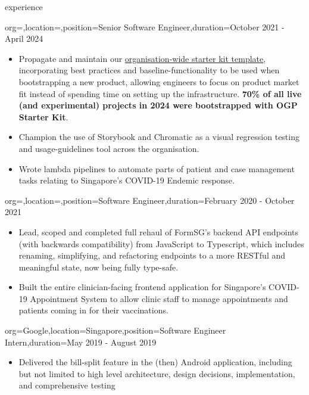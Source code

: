 \documentclass{resume}
\begin{document}
\begin{ResumeSection}{experience}
\begin{ResumeSubsection}{org=,location=,position={Senior Software Engineer},duration=October 2021 - April 2024}
\begin{itemize}
            \item Propagate and maintain our \href{https://start.open.gov.sg/}{organisation-wide starter kit template}, incorporating best practices and baseline-functionality to be used when bootstrapping a new product, allowing engineers to focus on product market fit instead of spending time on setting up the infrastructure. \textbf{70\% of all live (and experimental) projects in 2024 were bootstrapped with OGP Starter Kit}.
            \item Champion the use of Storybook and Chromatic as a visual regression testing and usage-guidelines tool across the organisation.
            \item Wrote lambda pipelines to automate parts of patient and case management tasks relating to Singapore’s COVID-19 Endemic response.
        \end{itemize}
        \medskip
    \end{ResumeSubsection}
    \begin{ResumeSubsection}{org=,location=,position={Software Engineer},duration=February 2020 - October 2021}
        \begin{itemize}
            \item Lead, scoped and completed full rehaul of FormSG’s backend API endpoints (with backwards compatibility) from JavaScript to Typescript, which includes renaming, simplifying, and refactoring endpoints to a more RESTful and meaningful state, now being fully type-safe.
            \item Built the entire clinician-facing frontend application for Singapore’s COVID-19 Appointment System to allow clinic staff to manage appointments and patients coming in for their vaccinations.
        \end{itemize}
        \bigskip
    \end{ResumeSubsection}
    \begin{ResumeSubsection}{org=Google,location={Singapore},position={Software Engineer Intern},duration=May 2019 - August 2019}
        \begin{itemize} 
            \item Delivered the bill-split feature in the (then) Android application, including but not limited to high level architecture, design decisions, implementation, and comprehensive testing
        \end{itemize}
        \bigskip
    \end{ResumeSubsection}
\end{ResumeSection}
\end{document}
